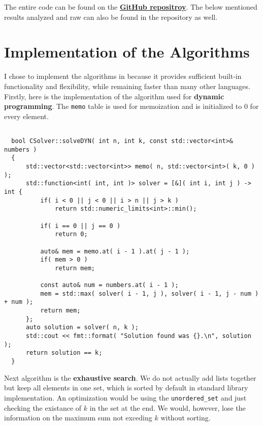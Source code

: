 \documentclass[11pt]{article}
\begin{document}
\maketitle

The entire code can be found on the \href{https://github.com/Edelwy/approximation-algorithms}{\textbf{GitHub repositroy}}. The below mentioned results analyzed and raw can also be found in the repository as well.

\section{Implementation of the Algorithms}

I chose to implement the algorithms in \cpp because it provides sufficient built-in functionality and flexibility, while remaining faster than many other languages. Firstly, here is the implementation of the algorithm used for \textbf{dynamic programming}. The \texttt{memo} table is used for memoization and is initialized to $0$ for every element.

\begin{verbatim}

  bool CSolver::solveDYN( int n, int k, const std::vector<int>& numbers )
  {
      std::vector<std::vector<int>> memo( n, std::vector<int>( k, 0 ) );
      std::function<int( int, int )> solver = [&]( int i, int j ) -> int {
          if( i < 0 || j < 0 || i > n || j > k )
              return std::numeric_limits<int>::min();
  
          if( i == 0 || j == 0 )
              return 0;
  
          auto& mem = memo.at( i - 1 ).at( j - 1 );
          if( mem > 0 ) 
              return mem;
  
          const auto& num = numbers.at( i - 1 );
          mem = std::max( solver( i - 1, j ), solver( i - 1, j - num ) + num );
          return mem;
      };
      auto solution = solver( n, k );
      std::cout << fmt::format( "Solution found was {}.\n", solution );
      return solution == k;
  }
\end{verbatim}

Next algorithm is the \textbf{exhaustive search}. We do not actually add lists together but keep all elements in one set, which is sorted by default in \cpp standard library implementation. An optimization would be using the \texttt{unordered\_set} and just checking the existance of $k$ in the set at the end. We would, however, lose the information on the maximum sum not exceding $k$ without sorting.
\end{document}

